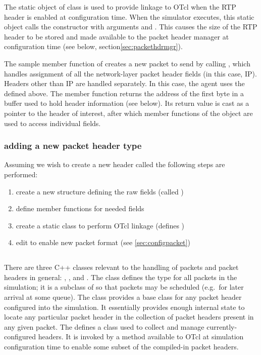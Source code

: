 The static object  of class 
is used to provide linkage to OTcl when the RTP header is
enabled at configuration time.
When the simulator executes, this static object calls
the  constructor with arguments
 and .
This causes the size of the RTP header to be stored
and made available to the packet header manager
at configuration time (see below, section\ref{sec:packethdrmgr}).

The sample member function 
of  creates a new packet
to send by calling , which handles assignment
of all the network-layer packet header fields (in this case, IP).
Headers other than IP are handled separately.
In this case, the agent uses the  defined above.
The  member function returns the address
of the first byte in a buffer used to hold header information (see below).
Its return value is cast as a pointer to the header of interest,
after which member functions of the 
object are used to access individual fields.

\subsubsection{adding a new packet header type}

Assuming we wish to create a new header called 
the following steps are performed:
\begin{enumerate}
        \item create a new structure defining the raw fields (called )
        \item define member functions for needed fields
	\item create a static class to perform OTcl linkage (defines )
        \item edit  to enable new packet format (see \ref{sec:configpacket})
\end{enumerate}

\subsection{}

There are three C++ classes relevant to the handling of packets
and packet headers in general: ,
, and .
The  class defines the type for all packets in the
simulation; it is a subclass of  so that packets may
be scheduled (e.g.~for later arrival at some queue).
The  class provides a base class for
any packet header configured into the simulation.
It essentially provides 
enough internal state to locate any particular packet
header in the collection of packet headers present in any given packet.
The  defines a class used to collect
and manage currently-configured headers.
It is invoked by a method available to OTcl at simulation configuration
time to enable some subset of the compiled-in packet headers.

